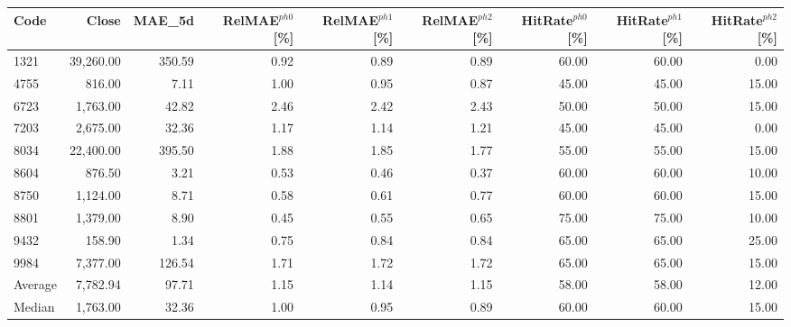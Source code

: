 \begingroup
\footnotesize
\begin{tabular}{lrrrrrrrr}
\hline
Code & Close & MAE\_5d & RelMAE$^{ph0}$[\%] & RelMAE$^{ph1}$[\%] & RelMAE$^{ph2}$[\%] & HitRate$^{ph0}$[\%] & HitRate$^{ph1}$[\%] & HitRate$^{ph2}$[\%] \\
\hline
1321 & 39,260.00 & 350.59 & 0.92 & 0.89 & 0.89 & 60.00 & 60.00 & 0.00 \\
4755 & 816.00 & 7.11 & 1.00 & 0.95 & 0.87 & 45.00 & 45.00 & 15.00 \\
6723 & 1,763.00 & 42.82 & 2.46 & 2.42 & 2.43 & 50.00 & 50.00 & 15.00 \\
7203 & 2,675.00 & 32.36 & 1.17 & 1.14 & 1.21 & 45.00 & 45.00 & 0.00 \\
8034 & 22,400.00 & 395.50 & 1.88 & 1.85 & 1.77 & 55.00 & 55.00 & 15.00 \\
8604 & 876.50 & 3.21 & 0.53 & 0.46 & 0.37 & 60.00 & 60.00 & 10.00 \\
8750 & 1,124.00 & 8.71 & 0.58 & 0.61 & 0.77 & 60.00 & 60.00 & 15.00 \\
8801 & 1,379.00 & 8.90 & 0.45 & 0.55 & 0.65 & 75.00 & 75.00 & 10.00 \\
9432 & 158.90 & 1.34 & 0.75 & 0.84 & 0.84 & 65.00 & 65.00 & 25.00 \\
9984 & 7,377.00 & 126.54 & 1.71 & 1.72 & 1.72 & 65.00 & 65.00 & 15.00 \\
Average & 7,782.94 & 97.71 & 1.15 & 1.14 & 1.15 & 58.00 & 58.00 & 12.00 \\
Median & 1,763.00 & 32.36 & 1.00 & 0.95 & 0.89 & 60.00 & 60.00 & 15.00 \\
\hline
\end{tabular}
\endgroup
